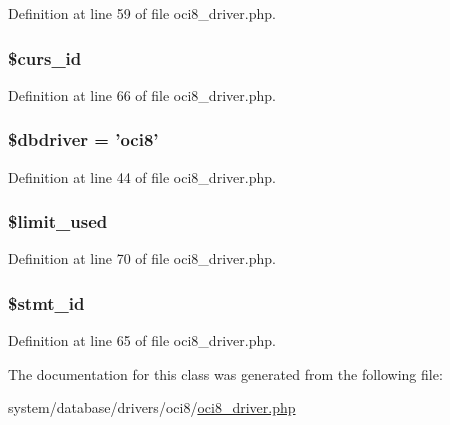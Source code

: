 Definition at line 59 of file oci8\-\_\-driver.\-php.

\hypertarget{class_c_i___d_b__oci8__driver_a75e7d18ad2e68ace3813533c9da2e179}{
\subsubsection[{\$curs\-\_\-id}]{\setlength{\rightskip}{0pt plus 5cm}\$curs\-\_\-id}}\label{class_c_i___d_b__oci8__driver_a75e7d18ad2e68ace3813533c9da2e179}


Definition at line 66 of file oci8\-\_\-driver.\-php.

\hypertarget{class_c_i___d_b__oci8__driver_a0cde2a16322a023d040aa7f725877597}{
\subsubsection[{\$dbdriver}]{\setlength{\rightskip}{0pt plus 5cm}\$dbdriver = 'oci8'}}\label{class_c_i___d_b__oci8__driver_a0cde2a16322a023d040aa7f725877597}


Definition at line 44 of file oci8\-\_\-driver.\-php.

\hypertarget{class_c_i___d_b__oci8__driver_a96df35d7e3e76bef21ebb80234fe59e8}{
\subsubsection[{\$limit\-\_\-used}]{\setlength{\rightskip}{0pt plus 5cm}\$limit\-\_\-used}}\label{class_c_i___d_b__oci8__driver_a96df35d7e3e76bef21ebb80234fe59e8}


Definition at line 70 of file oci8\-\_\-driver.\-php.

\hypertarget{class_c_i___d_b__oci8__driver_a1a97f17fd259cd27c73b65e6c3706ec0}{
\subsubsection[{\$stmt\-\_\-id}]{\setlength{\rightskip}{0pt plus 5cm}\$stmt\-\_\-id}}\label{class_c_i___d_b__oci8__driver_a1a97f17fd259cd27c73b65e6c3706ec0}


Definition at line 65 of file oci8\-\_\-driver.\-php.



The documentation for this class was generated from the following file\-:\begin{DoxyCompactItemize}
\item 
system/database/drivers/oci8/\hyperlink{oci8__driver_8php}{oci8\-\_\-driver.\-php}\end{DoxyCompactItemize}

